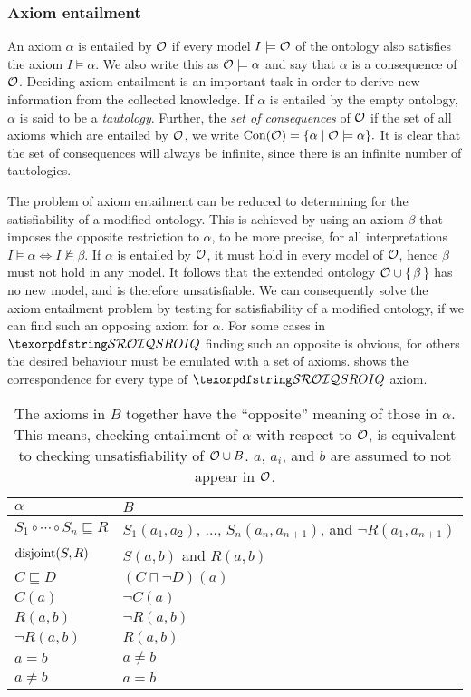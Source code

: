 \subsubsection{Axiom entailment} \label{axiom-entailment}

An axiom $\alpha$ is entailed by $\mathcal{O}$ if every model $I \models \mathcal{O}$ of the ontology also satisfies the axiom $I \models \alpha$. We also write this as $\mathcal{O} \models \alpha$ and say that $\alpha$ is a consequence of $\mathcal{O}$. Deciding axiom entailment is an important task in order to derive new information from the collected knowledge. If $\alpha$ is entailed by the empty ontology, $\alpha$ is said to be a \emph{tautology}. Further, the \emph{set of consequences} of $\mathcal{O}$ if the set of all axioms which are entailed by $\mathcal{O}$, we write $\operatorname{Con}(\mathcal{O}) = \{ \alpha \mid \mathcal{O} \models \alpha \}.$ It is clear that the set of consequences will always be infinite, since there is an infinite number of tautologies.

The problem of axiom entailment can be reduced to determining for the satisfiability of a modified ontology. This is achieved by using an axiom $\beta$ that imposes the opposite restriction to $\alpha$, to be more precise, for all interpretations $I \models \alpha \iff I \not\models \beta$. If $\alpha$ is entailed by $\mathcal{O}$, it must hold in every model of $\mathcal{O}$, hence $\beta$ must not hold in any model. It follows that the extended ontology $\mathcal{O} \cup \{ \, \beta \, \}$ has no new model, and is therefore unsatisfiable. We can consequently solve the axiom entailment problem by testing for satisfiability of a modified ontology, if we can find such an opposing axiom for $\alpha$. For some cases in $\SROIQ$ finding such an opposite is obvious, for others the desired behaviour must be emulated with a set of axioms.  shows the correspondence for every type of $\SROIQ$ axiom.
\begin{table}[ht]
  \centering
  \begin{tabular}{|l|l|}
    \hline
    $\alpha$ & $B$ \\
    \hline
    $S_1 \circ \cdots \circ S_n \sqsubseteq R$ & $S_1(a_1, a_2)$, $\dots$, $S_n(a_n, a_{n + 1})$, and $\lnot R(a_1, a_{n + 1})$ \\
    $\operatorname{disjoint}(S, R)$ & $S(a, b)$ and $R(a, b)$ \\
    $C \sqsubseteq D$ & $(C \sqcap \lnot D)(a)$ \\
    $C(a)$ & $\lnot C(a)$ \\
    $R(a, b)$ & $\lnot R(a, b)$ \\
    $\lnot R(a, b)$ & $R(a, b)$ \\
    $a = b$ & $a \not= b$ \\
    $a \not= b$ & $a = b$ \\
    \hline
  \end{tabular}
  \label{tab:entailment-reduction}
  \caption[Axioms substitution for reducing entailment to satisfiability]{The axioms in $B$ together have the “opposite” meaning of those in $\alpha$. This means, checking entailment of $\alpha$ with respect to $\mathcal{O}$, is equivalent to checking unsatisfiability of $\mathcal{O} \cup B$. $a$, $a_i$, and $b$ are assumed to not appear in $\mathcal{O}$.}
\end{table}

